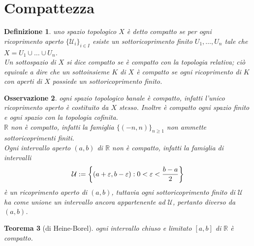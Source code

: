 \documentclass[oneside, 11pt]{amsbook}
\newcommand{\0}{{(0)}}
\newcommand{\3}{{(3)}}
\theoremstyle{colonplain}
\newtheorem{thm}{Teorema}[chapter]
\theoremstyle{colondefinition}
\newtheorem{defn}[thm]{Definizione}
\theoremstyle{colonremark}
\newtheorem{rmk}[thm]{Osservazione}
\numberwithin{equation}{chapter}
\begin{document}
\section{Compattezza}
\begin{defn}
uno spazio topologico $X$ è detto compatto se per ogni \textit{ricoprimento aperto} $\{ \mathcal{U}_i \}_{i \in I}$ esiste un \textit{sottoricoprimento finito} $U_1, \dots, U_n$ tale che $X = U_1 \cup \dots \cup U_n$. \\
Un sottospazio di $X$ si dice compatto se è compatto con la topologia relativa; ciò equivale a dire che un sottoinsieme $K$ di $X$ è compatto se ogni ricoprimento di $K$ con aperti di $X$ possiede un sottoricoprimento finito.
\end{defn}
\begin{rmk}
ogni spazio topologico banale è compatto, infatti l'unico ricoprimento aperto è costituito da $X$ stesso. Inoltre è compatto ogni spazio finito e ogni spazio con la topologia cofinita. \\
$\mathbb{R}$ non è compatto, infatti la famiglia $\{ (-n, n) \}_{n \geq 1}$ non ammette sottoricoprimenti finiti. \\
Ogni intervallo aperto $(a, b)$ di $\mathbb{R}$ non è compatto, infatti la famiglia di intervalli
\begin{align}
    \mathcal{U} := \left\{ (a + \varepsilon, b - \varepsilon) : 0 < \varepsilon < \frac{b - a}{2} \right\} \notag
\end{align}
è un ricoprimento aperto di $(a, b)$, tuttavia ogni sottoricoprimento finito di $\mathcal{U}$ ha come unione un intervallo ancora appartenente ad $\mathcal{U}$, pertanto diverso da $(a, b)$.
\end{rmk}
\begin{thm}[di Heine-Borel]\label{HeineBorel}
ogni intervallo chiuso e limitato $[a, b]$ di $\mathbb{R}$ è compatto.
\end{thm}
\end{document}
